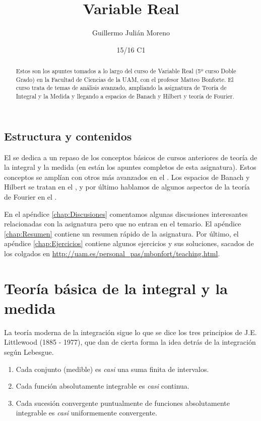 \documentclass[palatino]{apuntes}
\title{Variable Real}
\author{Guillermo Julián Moreno}
\date{15/16 C1}
\begin{document}
\pagestyle{plain}

\begin{abstract}
Estos son los apuntes tomados a lo largo del curso de Variable Real (5º curso Doble Grado) en la Facultad de Ciencias de la UAM, con el profesor Matteo Bonforte. El curso trata de temas de análisis avanzado, ampliando la asignatura de Teoría de Integral y la Medida \citep{ApuntesTIM} y llegando a espacios de Banach y Hilbert y teoría de Fourier.
\end{abstract}

\maketitle
\section*{Estructura y contenidos}

El  se dedica a un repaso de los conceptos básicos de cursos anteriores de teoría de la integral y la medida (en \citep{ApuntesTIM} están los apuntes completos de esta asignatura). Estos conceptos se amplían con otros más avanzados en el . Los espacios de Banach y Hilbert se tratan en el , y por último hablamos de algunos aspectos de la teoría de Fourier en el .

En el apéndice \ref{chap:Discusiones} comentamos algunas discusiones interesantes relacionadas con la asignatura pero que no entran en el temario. El apéndice \ref{chap:Resumen} contiene un resumen rápido de la asignatura. Por último, el apéndice \ref{chap:Ejercicios} contiene algunos ejercicios y sus soluciones, sacados de los colgados en \url{http://uam.es/personal_pas/mbonfort/teaching.html}.

\tableofcontents

\chapter{Teoría básica de la integral y la medida}
\label{chap:TeoriaBasicaIntegral}

La teoría moderna de la integración sigue lo que se dice los tres principios de J.E. Littlewood (1885 - 1977), que dan de cierta forma la idea detrás de la integración según Lebesgue.

\begin{enumerate}
\item Cada conjunto (medible) es \textit{casi} una suma finita de intervalos.
\item Cada función absolutamente integrable es \textit{casi} continua.
\item Cada sucesión convergente puntualmente de funciones absolutamente integrable es \textit{casi} uniformemente convergente.
\end{enumerate}
\end{document}
